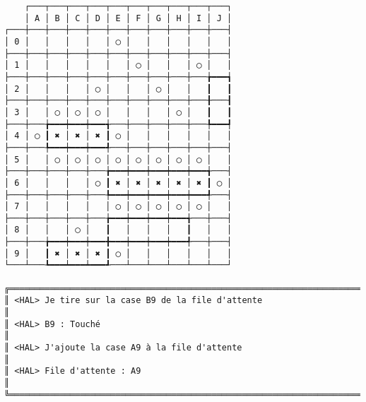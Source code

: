 {\scriptsize
\begin{verbatim}
    ┌───┬───┬───┬───┬───┬───┬───┬───┬───┬───┐
    │ A │ B │ C │ D │ E │ F │ G │ H │ I │ J │
┌───┼───┼───┼───┼───┼───┼───┼───┼───┼───┼───┤
│ 0 │   │   │   │   │ ◯ │   │   │   │   │   │
├───┼───┼───┼───┼───┼───┼───┼───┼───┼───┼───┤
│ 1 │   │   │   │   │   │ ◯ │   │   │ ◯ │   │
├───┼───┼───┼───┼───┼───┼───┼───┼───┼───╆━━━┪
│ 2 │   │   │   │ ◯ │   │   │ ◯ │   │   ┃   ┃
├───┼───┼───┼───┼───┼───┼───┼───┼───┼───╂───┨
│ 3 │   │ ◯ │ ◯ │ ◯ │   │   │   │ ◯ │   ┃   ┃
├───┼───╆━━━┿━━━┿━━━╅───┼───┼───┼───┼───╄━━━┩
│ 4 │ ◯ ┃ ✖ │ ✖ │ ✖ ┃ ◯ │   │   │   │   │   │
├───┼───╄━━━┿━━━┿━━━╃───┼───┼───┼───┼───┼───┤
│ 5 │   │ ◯ │ ◯ │ ◯ │ ◯ │ ◯ │ ◯ │ ◯ │ ◯ │   │
├───┼───┼───┼───┼───╆━━━┿━━━┿━━━┿━━━┿━━━╅───┤
│ 6 │   │   │   │ ◯ ┃ ✖ │ ✖ │ ✖ │ ✖ │ ✖ ┃ ◯ │
├───┼───┼───┼───┼───╄━━━┿━━━┿━━━┿━━━┿━━━╃───┤
│ 7 │   │   │   │   │ ◯ │ ◯ │ ◯ │ ◯ │ ◯ │   │
├───┼───┼───┼───┼───╆━━━┿━━━┿━━━┿━━━╅───┼───┤
│ 8 │   │   │ ◯ │   ┃   │   │   │   ┃   │   │
├───┼───╆━━━┿━━━┿━━━╋━━━┿━━━┿━━━┿━━━╃───┼───┤
│ 9 │   ┃ ✖ │ ✖ │ ✖ ┃ ◯ │   │   │   │   │   │
└───┴───┺━━━┷━━━┷━━━┹───┴───┴───┴───┴───┴───┘

╔══════════════════════════════════════════════════════════════════════════════════════════════════╗
║ <HAL> Je tire sur la case B9 de la file d'attente                                                ║
║ <HAL> B9 : Touché                                                                                ║
║ <HAL> J'ajoute la case A9 à la file d'attente                                                    ║
║ <HAL> File d'attente : A9                                                                        ║
╚══════════════════════════════════════════════════════════════════════════════════════════════════╝
\end{verbatim}}
\newpage

